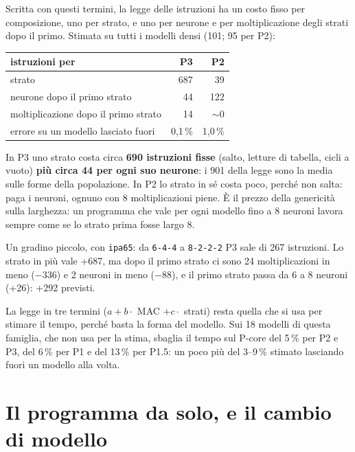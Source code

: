 \documentclass[11pt,a4paper,oneside]{report}
\begin{document}
Scritta con questi termini, la legge delle istruzioni ha un costo fisso per
composizione, uno per strato, e uno per neurone e per moltiplicazione degli
strati dopo il primo. Stimata su tutti i modelli densi (101; 95 per P2):

\begin{center}
\small
\begin{tabular}{@{}lrr@{}}
\toprule
\textbf{istruzioni per} & \textbf{P3} & \textbf{P2} \\
\midrule
strato                                & 687 & 39 \\
neurone dopo il primo strato          & 44  & 122 \\
moltiplicazione dopo il primo strato  & 14  & $\sim$0 \\
\midrule
errore su un modello lasciato fuori   & 0,1\,\% & 1,0\,\% \\
\bottomrule
\end{tabular}
\end{center}

\begin{lezione}
In P3 uno strato costa circa \textbf{690 istruzioni fisse} (salto, letture di
tabella, cicli a vuoto) \textbf{più circa 44 per ogni suo neurone}: i 901 della
legge sono la media sulle forme della popolazione. In P2 lo strato in sé costa
poco, perché non salta: paga i neuroni, ognuno con 8 moltiplicazioni piene. È il
prezzo della genericità sulla larghezza: un programma che vale per ogni modello
fino a 8 neuroni lavora sempre come se lo strato prima fosse largo 8.
\end{lezione}

Un gradino piccolo, con \texttt{ipa65}: da \texttt{6-4-4} a \texttt{8-2-2-2} P3
sale di 267 istruzioni. Lo strato in più vale +687, ma dopo il primo strato ci
sono 24 moltiplicazioni in meno ($-$336) e 2 neuroni in meno ($-$88), e il primo
strato passa da 6 a 8 neuroni (+26): +292 previsti.

La legge in tre termini ($a + b \cdot$ MAC $+ c \cdot$ strati) resta quella che
si usa per stimare il tempo, perché basta la forma del modello. Sui 18 modelli
di questa famiglia, che non usa per la stima, sbaglia il tempo sul P-core del
5\,\% per P2 e P3, del 6\,\% per P1 e del 13\,\% per P1.5: un poco più del
3--9\,\% stimato lasciando fuori un modello alla volta.

\section{Il programma da solo, e il cambio di modello}
\label{sec:pop-solo}
\end{document}
